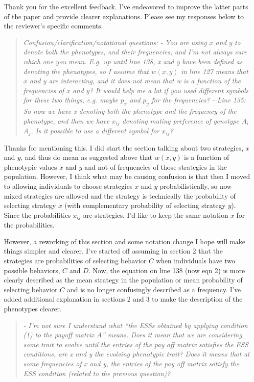 \documentclass[10pt,parskip=full,foldmarks=off,addrfield=off,backaddress=false,refline=dateleft,letterpaper]{scrlttr2}
\newenvironment{reviewerquote}{\begin{quote}\color{DarkBlue}\itshape}{\end{quote}}
\begin{document}
\begin{letter}
Thank you for the excellent feedback. I've endeavored to improve the latter parts of the paper and provide clearer explanations. Please see my responses below to the reviewer's specific comments.

\begin{reviewerquote}
Confusion/clarification/notational questions:
- You are using $x$ and $y$ to denote both the phenotypes, and their frequencies, and I’m not always sure which one you mean. E.g. up until line 138, x and y have been defined as denoting the phenotypes, so I assume that $w(x,y)$ in line 127 means that $x$ and $y$ are interacting, and it does not mean that w is a function of the frequencies of $x$ and $y$? It would help me a lot if you used different symbols for these two things, e.g. maybe $p_x$ and $p_y$ for the frequencies?
- Line 135: So now we have x denoting both the phenotype and the frequency of the phenotype, and then we have $x_{ij}$ denoting mating preference of genotype $A_i$ $A_j$. Is it possible to use a different symbol for $x_{ij}$?
\end{reviewerquote}

Thanks for mentioning this. I did start the section talking about two strategies, $x$ and $y$, and thus do mean as suggested above that $w(x,y)$  is a function of phenotypic values $x$ and $y$ and not of frequencies of those strategies in the population. However, I think what may be causing confusion is that then I moved to allowing individuals to choose strategies $x$ and $y$ probabilistically, so now mixed strategies are allowed and the strategy is technically the probability of selecting strategy $x$ (with complementary probability of selecting strategy $y$). Since the probabilities $x_{ij}$ are strategies, I'd like to keep the same notation $x$ for the probabilities.

However, a reworking of this section and some notation change I hope will make things simpler and clearer. I've started off assuming in section 2 that the strategies are probabilities of selecting behavior $C$ when individuals have two possible behaviors, $C$ and $D$. Now, the equation on line 138 (now eqn 2) is more clearly described as the mean strategy in the population or mean probability of selecting behavior $C$ and is no longer confusingly described as a frequency. I've added additional explanation in sections 2 and 3 to make the description of the phenotypes clearer.

\begin{reviewerquote}
- I’m not sure I understand what “the ESSs obtained by applying condition (1) to the payoff matrix $A$” means. Does it mean that we are considering some trait to evolve until the entries of the pay off matrix satisfies the ESS conditions, are x and y the evolving phenotypic trait? Does it means that at some frequencies of x and y, the entries of the pay off matrix satisfy the ESS condition (related to the previous question)?
\end{reviewerquote}


\end{letter}
\end{document}
